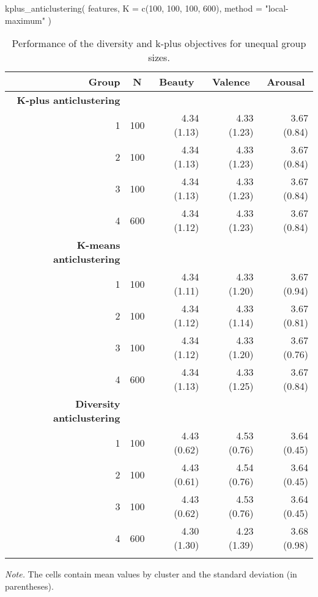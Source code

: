 \documentclass[
  man,floatsintext]{apa7}
\newenvironment{Shaded}{\begin{snugshade}}{\end{snugshade}}
\newcommand{\AttributeTok}[1]{\textcolor[rgb]{0.77,0.63,0.00}{#1}}
\newcommand{\DecValTok}[1]{\textcolor[rgb]{0.00,0.00,0.81}{#1}}
\newcommand{\FunctionTok}[1]{\textcolor[rgb]{0.00,0.00,0.00}{#1}}
\newcommand{\NormalTok}[1]{#1}
\newcommand{\StringTok}[1]{\textcolor[rgb]{0.31,0.60,0.02}{#1}}
\begin{document}
\begin{Shaded}
\begin{Highlighting}[]
\FunctionTok{kplus\_anticlustering}\NormalTok{(}
\NormalTok{  features,}
  \AttributeTok{K =} \FunctionTok{c}\NormalTok{(}\DecValTok{100}\NormalTok{, }\DecValTok{100}\NormalTok{, }\DecValTok{100}\NormalTok{, }\DecValTok{600}\NormalTok{),}
  \AttributeTok{method =} \StringTok{"local{-}maximum"}
\NormalTok{)}
\end{Highlighting}
\end{Shaded}

\begin{table}[tbp]

\begin{center}
\begin{threeparttable}

\caption{\label{tab:unnamed-chunk-3}Performance of the diversity and k-plus objectives for unequal group sizes.}

\begin{tabular}{rrrrr}
\toprule
Group & \multicolumn{1}{c}{N} & \multicolumn{1}{c}{Beauty} & \multicolumn{1}{c}{Valence} & \multicolumn{1}{c}{Arousal}\\
\midrule
\textbf{K-plus anticlustering} &  &  &  & \\
\ \ \ 1 & 100 & 4.34 (1.13) & 4.33 (1.23) & 3.67 (0.84)\\
\ \ \ 2 & 100 & 4.34 (1.13) & 4.33 (1.23) & 3.67 (0.84)\\
\ \ \ 3 & 100 & 4.34 (1.13) & 4.33 (1.23) & 3.67 (0.84)\\
\ \ \ 4 & 600 & 4.34 (1.12) & 4.33 (1.23) & 3.67 (0.84)\\
\textbf{K-means anticlustering} &  &  &  & \\
\ \ \ 1 & 100 & 4.34 (1.11) & 4.33 (1.20) & 3.67 (0.94)\\
\ \ \ 2 & 100 & 4.34 (1.12) & 4.33 (1.14) & 3.67 (0.81)\\
\ \ \ 3 & 100 & 4.34 (1.12) & 4.33 (1.20) & 3.67 (0.76)\\
\ \ \ 4 & 600 & 4.34 (1.13) & 4.33 (1.25) & 3.67 (0.84)\\
\textbf{Diversity anticlustering} &  &  &  & \\
\ \ \ 1 & 100 & 4.43 (0.62) & 4.53 (0.76) & 3.64 (0.45)\\
\ \ \ 2 & 100 & 4.43 (0.61) & 4.54 (0.76) & 3.64 (0.45)\\
\ \ \ 3 & 100 & 4.43 (0.62) & 4.53 (0.76) & 3.64 (0.45)\\
\ \ \ 4 & 600 & 4.30 (1.30) & 4.23 (1.39) & 3.68 (0.98)\\
\bottomrule
\addlinespace
\end{tabular}

\begin{tablenotes}[para]
\normalsize{\textit{Note.} The cells contain mean values by cluster and the standard deviation (in parentheses).}
\end{tablenotes}

\end{threeparttable}
\end{center}

\end{table}
\end{document}
